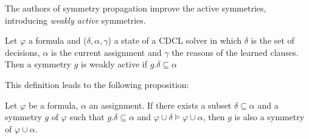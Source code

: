 

The authors of symmetry propagation improve the active symmetries, introducing \emph{weakly active} symmetries.

\begin{definition}
	\label{def:weakly_active_symmetry}
	Let $\varphi$ a formula and ($\delta, \alpha, \gamma$) a state of a CDCL solver in which $\delta$ is the set of decisions,
	$\alpha$ is the current assignment and $\gamma$ the reasons of the learned clauses. Then a symmetry $g$ is weakly active 
	if $g.\delta \subseteq \alpha$
\end{definition}

This definition leads to the following proposition:

\begin{proposition}
	Let $\varphi$ be a formula, $\alpha $ an assignment. If
	there exists a subset $\delta \subseteq \alpha $ and a symmetry $g$ of $\varphi$ such that 
	$g.\delta \subseteq \alpha $ and $\varphi \cup \delta \models \varphi \cup \alpha$, then $g$ 
	is also a symmetry of $\varphi \cup \alpha $.
\end{proposition}




\\
\\
\\
\\
\\




%



